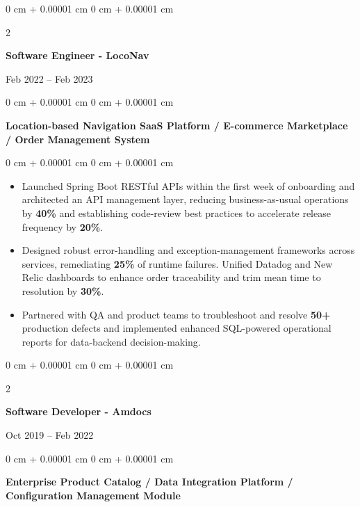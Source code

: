 \documentclass[10pt, letterpaper]{article}
\newenvironment{highlights}{
    \begin{itemize}[
        topsep=0.10 cm,
        parsep=0.10 cm,
        partopsep=0pt,
        itemsep=0pt,
        leftmargin=0 cm + 10pt
    ]
}{
    \end{itemize}
} %
\newenvironment{onecolentry}{
    \begin{adjustwidth}{
        0 cm + 0.00001 cm
    }{
        0 cm + 0.00001 cm
    }
}{
    \end{adjustwidth}
} %
\newenvironment{twocolentry}[2][]{
    \onecolentry
    \def\secondColumn{#2}
    \setcolumnwidth{\fill, 4.5 cm}
    \begin{paracol}{2}
}{
    \switchcolumn \raggedleft \secondColumn
    \end{paracol}
    \endonecolentry
} %
\begin{document}
        \vspace{0.1 cm}
        \begin{twocolentry}{Feb 2022 – Feb 2023}
            \textbf{Software Engineer - LocoNav}
            \end{twocolentry}
            \begin{onecolentry}
                \textbf{Location-based Navigation SaaS Platform / E-commerce Marketplace / Order Management System}
            \end{onecolentry}
        \vspace{0.10 cm}
        \begin{onecolentry}
            \begin{highlights}
                \item Launched Spring Boot RESTful APIs within the first week of onboarding and architected an API management layer, reducing business-as-usual operations by \textbf{40\%} and establishing code-review best practices to accelerate release frequency by \textbf{20\%}.
                
                
                \item Designed robust error-handling and exception-management frameworks across services, remediating \textbf{25\%} of runtime failures. Unified Datadog and New Relic dashboards to enhance order traceability and trim mean time to resolution by \textbf{30\%}.

                \item Partnered with QA and product teams to troubleshoot and resolve \textbf{50+} production defects and implemented enhanced SQL-powered operational reports for data-backend decision-making.
            \end{highlights}
        \end{onecolentry}


        \vspace{0.1 cm}
        \begin{twocolentry}{Oct 2019 – Feb 2022}
            \textbf{Software Developer - Amdocs}
        \end{twocolentry}
        \begin{onecolentry}
                \textbf{Enterprise Product Catalog / Data Integration Platform / Configuration Management Module}

        \end{onecolentry}
\end{document}
